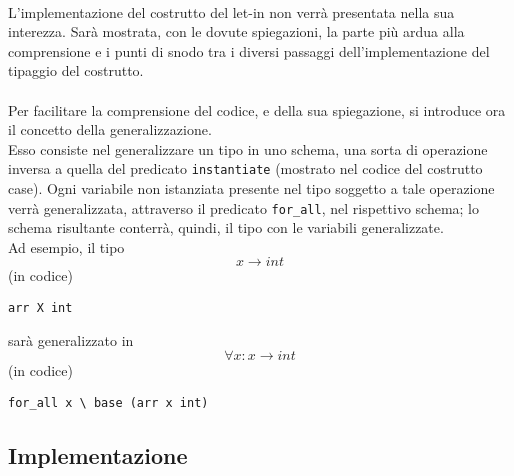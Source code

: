 \documentclass[12pt,a4paper,openright,twoside]{report}
\begin{document}
\paragraph{}
L'implementazione del costrutto del let-in non verrà presentata nella sua interezza. Sarà mostrata, con le dovute spiegazioni, la parte più ardua alla comprensione e i punti di snodo tra i diversi passaggi dell'implementazione del tipaggio del costrutto.

\paragraph{}
Per facilitare la comprensione del codice, e della sua spiegazione, si introduce ora il concetto della generalizzazione.\\
Esso consiste nel generalizzare un tipo in uno schema, una sorta di operazione inversa a quella del predicato \verb"instantiate" (mostrato nel codice del costrutto case). Ogni variabile non istanziata presente nel tipo soggetto a tale operazione verrà generalizzata, attraverso il predicato \verb"for_all", nel rispettivo schema; lo schema risultante conterrà, quindi, il tipo con le variabili generalizzate.\\
Ad esempio, il tipo
\begin{equation}
 x \rightarrow int \label{eq:x->int}
\end{equation}
(in codice)
\begin{center}
 \verb"arr X int"
\end{center}
sarà generalizzato in
\begin{equation}
 \forall x : x \rightarrow int \label{eq:fax->int}
\end{equation}
(in codice)
\begin{center}
 \verb"for_all x \ base (arr x int)"
\end{center}

\subsection{Implementazione}
\end{document}

